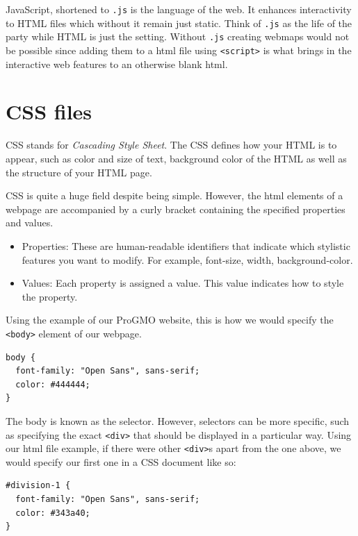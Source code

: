 \documentclass[
]{book}
\theoremstyle{definition}
\theoremstyle{definition}
\theoremstyle{definition}
\theoremstyle{definition}
\theoremstyle{remark}
\begin{document}
JavaScript, shortened to \texttt{.js} is the language of the web. It enhances interactivity to HTML files which without it remain just static. Think of \texttt{.js} as the life of the party while HTML is just the setting. Without \texttt{.js} creating webmaps would not be possible since adding them to a html file using \texttt{\textless{}script\textgreater{}} is what brings in the interactive web features to an otherwise blank html.

\hypertarget{css-files}{%
\section{CSS files}\label{css-files}}

CSS stands for \emph{Cascading Style Sheet}. The CSS defines how your HTML is to appear, such as color and size of text, background color of the HTML as well as the structure of your HTML page.

CSS is quite a huge field despite being simple. However, the html elements of a webpage are accompanied by a curly bracket containing the specified properties and values.

\begin{itemize}
\item
  Properties: These are human-readable identifiers that indicate which stylistic features you want to modify. For example, font-size, width, background-color.
\item
  Values: Each property is assigned a value. This value indicates how to style the property.
\end{itemize}

Using the example of our ProGMO website, this is how we would specify the \texttt{\textless{}body\textgreater{}} element of our webpage.

\begin{verbatim}
body {
  font-family: "Open Sans", sans-serif;
  color: #444444;
}
\end{verbatim}

The body is known as the selector. However, selectors can be more specific, such as specifying the exact \texttt{\textless{}div\textgreater{}} that should be displayed in a particular way. Using our html file example, if there were other \texttt{\textless{}div\textgreater{}}s apart from the one above, we would specify our first one in a CSS document like so:

\begin{verbatim}
#division-1 {
  font-family: "Open Sans", sans-serif;
  color: #343a40;
}
\end{verbatim}
\end{document}
